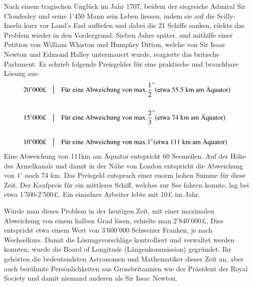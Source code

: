 \begin{refsection}
Nach einem tragischen Unglück im Jahr 1707, beidem der siegreiche Admiral Sir Cloudesley und seine 1’450 Mann sein Leben liessen, indem sie auf die Scilly-Inseln kurz vor Land’s End aufliefen und dabei die 21 Schiffe sanken, rückte das Problem wieder in den Vordergrund.
Sieben Jahre später, und mithilfe einer Petition von William Whiston und Humphry Ditton, welche von Sir Isaac Newton und Edmond Halley untermauert wurde, reagierte das britische Parlament.
Es schrieb folgende Preisgelder für eine praktische und brauchbare Lösung aus:
\[
\begin{aligned}
&\text{20’000£}
&
&\text{\big \vert}
&
&\text{Für eine Abweichung von max.} \frac{1}{2}^{\circ} \text{(etwa 55.5 km am Äquator)}
\\
\\
&\text{15’000£}
&
&\text{\big \vert}
&
&\text{Für eine Abweichung von max.} \frac{2}{3}^{\circ} \text{(etwa 74 km am Äquator)}
\\
\\
&\text{10’000£}
&
&\text{\big \vert}
&
&\text{Für eine Abweichung von max.} 1 ^{\circ} \text{(etwa 111 km am Äquator)}
\end{aligned}
\]
Eine Abweichung von 111km am Äquator entspricht 60 Seemeilen.
Auf der Höhe des Ärmelkanals und damit in der Nähe von London entspricht die Abweichung von $1 ^{\circ}$ noch 74 km.
Das Preisgeld entsprach einer enorm hohen Summe für diese Zeit. Der Kaufpreis für ein mittleres Schiff, welches zur See fahren konnte, lag bei etwa 1’500-2’500£. Ein einzelner Arbeiter lebte mit 10£ im Jahr.

Würde man dieses Problem in der heutigen Zeit, mit einer maximalen Abweichung von einem halben Grad lösen, erhielte man 2’840’000£. Dies entspricht etwa einem Wert von 3’600’000 Schweizer Franken, je nach Wechselkurs.
Damit die Lösungsvorschläge kontrolliert und verwaltet werden konnten, wurde die Board of Longitude (Längenkommission) gegründet. Ihr gehörten die bedeutendsten Astronomen und Mathematiker dieser Zeit an, aber auch berühmte Persönlichkeiten aus Grossbritannien wie der Präsident der Royal Society und damit niemand anderen als Sir Issac Newton.




\end{refsection}
